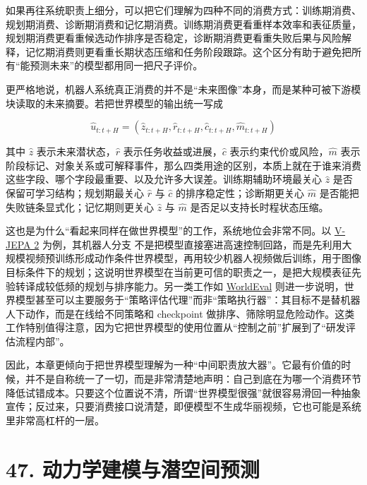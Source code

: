 如果再往系统职责上细分，可以把它们理解为四种不同的消费方式：训练期消费、规划期消费、诊断期消费和记忆期消费。训练期消费更看重样本效率和表征质量，规划期消费更看重候选动作排序是否稳定，诊断期消费更看重失败后果与风险解释，记忆期消费则更看重长期状态压缩和任务阶段跟踪。这个区分有助于避免把所有“能预测未来”的模型都用同一把尺子评价。

更严格地说，机器人系统真正消费的并不是“未来图像”本身，而是某种可被下游模块读取的未来摘要。若把世界模型的输出统一写成

\begingroup
\scriptsize
\begin{equation*}
\hat{u}_{t:t+H} =
\left(
\hat{z}_{t:t+H},
\hat{r}_{t:t+H},
\hat{c}_{t:t+H},
\hat{m}_{t:t+H}
\right)
\end{equation*}
\endgroup

其中 \(\hat{z}\) 表示未来潜状态，\(\hat{r}\) 表示任务收益或进展，\(\hat{c}\) 表示约束代价或风险，\(\hat{m}\) 表示阶段标记、对象关系或可解释事件，那么四类用途的区别，本质上就在于谁来消费这些字段、哪个字段最重要、以及允许多大误差。训练期辅助环境最关心 \(\hat{z}\) 是否保留可学习结构；规划期最关心 \(\hat{r}\) 与 \(\hat{c}\) 的排序稳定性；诊断期更关心 \(\hat{m}\) 是否能把失败链条显式化；记忆期则更关心 \(\hat{z}\) 与 \(\hat{m}\) 是否足以支持长时程状态压缩。

这也是为什么“看起来同样在做世界模型”的工作，系统地位会非常不同。以 \href{https://arxiv.org/abs/2506.09985}{V-JEPA 2} 为例，其机器人分支 \texttt{} 不是把模型直接塞进高速控制回路，而是先利用大规模视频预训练形成动作条件世界模型，再用较少机器人视频做后训练，用于图像目标条件下的规划；这说明世界模型在当前更可信的职责之一，是把大规模表征先验转译成较低频的规划与排序能力。另一类工作如 \href{https://arxiv.org/abs/2505.19017}{WorldEval} 则进一步说明，世界模型甚至可以主要服务于“策略评估代理”而非“策略执行器”：其目标不是替机器人下动作，而是在线给不同策略和 checkpoint 做排序、筛除明显危险动作。这类工作特别值得注意，因为它把世界模型的使用位置从“控制之前”扩展到了“研发评估流程内部”。

因此，本章更倾向于把世界模型理解为一种“中间职责放大器”。它最有价值的时候，并不是自称统一了一切，而是非常清楚地声明：自己到底在为哪一个消费环节降低试错成本。只要这个位置说不清，所谓“世界模型很强”就很容易滑回一种抽象宣传；反过来，只要消费接口说清楚，即便模型不生成华丽视频，它也可能是系统里非常高杠杆的一层。

\section*{47. 动力学建模与潜空间预测}


